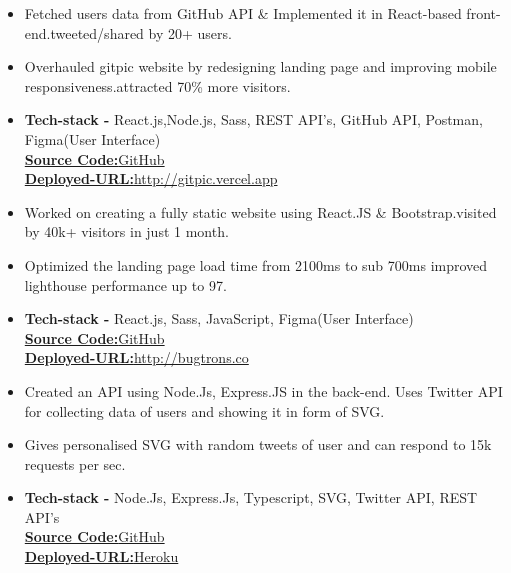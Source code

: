 \documentclass[10pt,a4paper,ragged2e]{altacv}
\begin{document}
\begin{itemize}
\item Fetched users data from GitHub API \& Implemented it in React-based front-end.tweeted/shared by 20+ users.
\item Overhauled gitpic website by redesigning landing page and improving mobile responsiveness.attracted 70\% more visitors.
\item \textbf{Tech-stack -} React.js,Node.js, Sass, REST API's,  GitHub API, Postman, Figma(User Interface)
\\
 \href{https://github.com/ghulamyazdani/Gitpic}{\textbf{Source Code:}GitHub}
 \\
 \href{http://gitpic.vercel.app}{\textbf{Deployed-URL:}http://gitpic.vercel.app}

\end{itemize}
\smallskip
{}
\begin{itemize}
\item Worked on creating a fully static website using React.JS \& Bootstrap.visited by 40k+ visitors in just 1 month.
\item Optimized the landing page load time from 2100ms to sub 700ms improved lighthouse performance up to 97.
\item \textbf{Tech-stack -} React.js, Sass, JavaScript, Figma(User Interface)
\\
 \href{https://github.com/ghulamyazdani/bugtrons.co}{\textbf{Source Code:}GitHub}
 \\
 \href{http://bugtrons.co}{\textbf{Deployed-URL:}http://bugtrons.co}

\end{itemize}
\smallskip
{}
\begin{itemize}
\item Created an API using Node.Js, Express.JS in the back-end. Uses Twitter API for collecting data of users and showing it in form of SVG.
\item Gives personalised SVG with random tweets of user and can respond to 15k requests per sec.
\item \textbf{Tech-stack -} Node.Js, Express.Js, Typescript, SVG, Twitter API, REST API's
\\
 \href{https://github.com/ghulamyazdani/tweetup}{\textbf{Source Code:}GitHub}
 \\
 \href{https://tweerup.herokuapp.com/tweet?username=iamyazreza}{\textbf{Deployed-URL:}Heroku}

\end{itemize}
\smallskip
\end{document}
